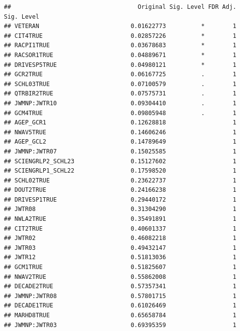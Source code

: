\documentclass[
]{article}
\begin{document}
\begin{verbatim}
##                                    Original Sig. Level FDR Adj. Sig. Level
## VETERAN                          0.01622773          *        1           
## CIT4TRUE                         0.02857226          *        1           
## RACPI1TRUE                       0.03678683          *        1           
## RACSOR1TRUE                      0.04889671          *        1           
## DRIVESP5TRUE                     0.04980121          *        1           
## GCR2TRUE                         0.06167725          .        1           
## SCHL03TRUE                       0.07100579          .        1           
## QTRBIR2TRUE                      0.07575731          .        1           
## JWMNP:JWTR10                     0.09304410          .        1           
## GCM4TRUE                         0.09805948          .        1           
## AGEP_GCR1                        0.12628818                   1           
## NWAV5TRUE                        0.14606246                   1           
## AGEP_GCL2                        0.14789649                   1           
## JWMNP:JWTR07                     0.15025585                   1           
## SCIENGRLP2_SCHL23                0.15127602                   1           
## SCIENGRLP1_SCHL22                0.17598520                   1           
## SCHL02TRUE                       0.23622737                   1           
## DOUT2TRUE                        0.24166238                   1           
## DRIVESP1TRUE                     0.29440172                   1           
## JWTR08                           0.31304290                   1           
## NWLA2TRUE                        0.35491891                   1           
## CIT2TRUE                         0.40601337                   1           
## JWTR02                           0.46082218                   1           
## JWTR03                           0.49432147                   1           
## JWTR12                           0.51813036                   1           
## GCM1TRUE                         0.51825607                   1           
## NWAV2TRUE                        0.55862008                   1           
## DECADE2TRUE                      0.57357341                   1           
## JWMNP:JWTR08                     0.57801715                   1           
## DECADE1TRUE                      0.61026469                   1           
## MARHD8TRUE                       0.65658784                   1           
## JWMNP:JWTR03                     0.69395359                   1           

\end{verbatim}
\end{document}
